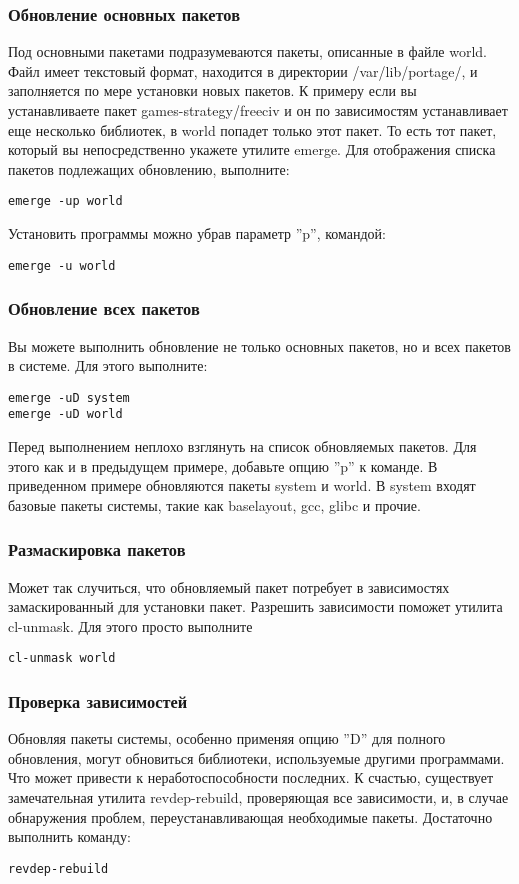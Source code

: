 \subsubsection{Обновление основных пакетов}
Под основными пакетами подразумеваются пакеты, описанные в файле world. Файл имеет текстовый формат, находится в директории /var/lib/portage/, и заполняется по мере установки новых пакетов. К примеру если вы устанавливаете пакет games-strategy/freeciv и он по зависимостям устанавливает еще несколько библиотек, в world попадет только этот пакет. То есть тот пакет, который вы непосредственно укажете утилите emerge.
Для отображения списка пакетов подлежащих обновлению, выполните:
\begin{verbatim}
emerge -up world
\end{verbatim}
Установить программы можно убрав параметр ''p'', командой:
\begin{verbatim}
emerge -u world
\end{verbatim}
\subsubsection{Обновление всех пакетов}
Вы можете выполнить обновление не только основных пакетов, но и всех пакетов в системе. Для этого выполните:
\begin{verbatim}
emerge -uD system
emerge -uD world
\end{verbatim}
Перед выполнением неплохо взглянуть на список обновляемых пакетов. Для этого как и в предыдущем примере, добавьте опцию ''p'' к команде.
В приведенном примере обновляются пакеты system и world. В system входят базовые пакеты системы, такие как baselayout, gcc, glibc и прочие.
\subsubsection{Размаскировка пакетов}
Может так случиться, что обновляемый пакет потребует в зависимостях замаскированный для установки пакет. Разрешить зависимости поможет утилита cl-unmask. Для этого просто выполните
\begin{verbatim}
cl-unmask world
\end{verbatim}
\subsubsection{Проверка зависимостей}
Обновляя пакеты системы, особенно применяя опцию ''D'' для полного обновления, могут обновиться библиотеки, используемые другими программами. Что может привести к неработоспособности последних. К счастью, существует замечательная утилита revdep-rebuild, проверяющая все зависимости, и, в случае обнаружения проблем, переустанавливающая необходимые пакеты. Достаточно выполнить команду:
\begin{verbatim}
revdep-rebuild
\end{verbatim}

